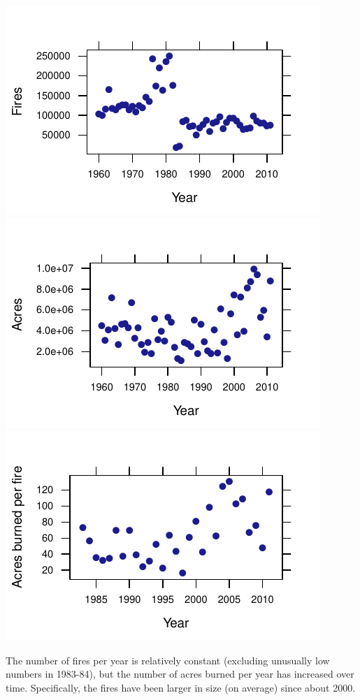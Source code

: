 \documentclass[twoside]{book}\usepackage[]{graphicx}\usepackage[]{xcolor}
\makeatletter
\def\maxwidth{ %
  \ifdim\Gin@nat@width>\linewidth
    \linewidth
  \else
    \Gin@nat@width
  \fi
}
\newenvironment{knitrout}{}{} %
\makeatother
\begin{document}
\begin{solution}
\begin{knitrout}
{\centering \includegraphics[width=\maxwidth]{figures/fig-unnamed-chunk-29-1} 
\includegraphics[width=\maxwidth]{figures/fig-unnamed-chunk-29-2} 
\includegraphics[width=\maxwidth]{figures/fig-unnamed-chunk-29-3} 

}



\end{knitrout}

The number of fires per year is relatively constant (excluding unusually low numbers in 1983-84), but the number of acres burned per year has increased over time.  Specifically, the fires have been larger in size (on average) since about 2000.
\end{solution}
\end{document}
